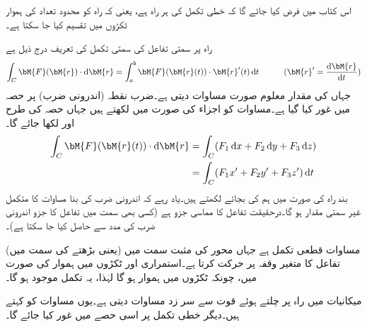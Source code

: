 اس کتاب میں فرض کیا جائے گا کہ خطی تکمل کی ہر راہ   ہے، یعنی کہ راہ کو محدود تعداد کی ہموار ٹکڑوں میں تقسیم کیا جا سکتا ہے۔

راہ  پر سمتی تفاعل  کی سمتی تکمل کی تعریف درج ذیل ہے
\begin{align}\label{مساوات_سمتی_تکمل_سمتی_تفاعل_تکمل_الف}
\int_C \bM{F}(\bM{r})\cdot \dif \bM{r}=\int_a^b \bM{F}(\bM{r}(t))\cdot \bM{r}'(t)\dif t\quad \quad \quad (\bM{r}'=\frac{\dif \bM{r}}{\dif t})
\end{align}
 جہاں  کی مقدار معلوم صورت  مساوات  دیتی ہے۔ضرب نقطہ (اندرونی ضرب) پر حصہ  میں غور کیا گیا ہے۔مساوات  کو اجزاء کی صورت میں لکھتے ہیں جہاں حصہ  کی طرح  اور  لکھا جائے گا۔
\begin{gather}
\begin{aligned}\label{مساوات_سمتی_تکمل_سمتی_تفاعل_تکمل_ب}
\int_C \bM{F}(\bM{r}(t))\cdot \dif \bM{r}&=\int_C(F_1\dif x+F_2\dif y+F_3\dif z)\\
&=\int_C (F_1x'+F_2y'+F_3z')\dif t
\end{aligned}
\end{gather}
بند راہ کی صورت میں ہم  کی بجائے  لکھتے ہیں۔یاد رہے کہ اندرونی ضرب کی بنا  مساوات  کا متکمل  غیر سمتی مقدار ہو گا۔درحقیقت  تفاعل  کا مماسی جزو ہے (کسی بھی سمت میں تفاعل کا جزو  اندرونی ضرب کی مدد سے حاصل کیا جا سکتا ہے)۔

مساوات   قطعی تکمل  ہے جہاں محور  کی مثبت سمت میں (یعنی بڑھتے  کی سمت میں) تفاعل کا متغیر   وقفہ  پر حرکت کرتا ہے۔استمراری  اور ٹکڑوں میں ہموار  کی صورت میں، چونکہ  ٹکڑوں میں ہموار ہو گا لہٰذا، یہ تکمل موجود ہو گا۔

میکانیات میں راہ  پر چلتے ہوئے قوت  سے سر زد   مساوات  دیتی ہے۔یوں مساوات  کو  کہتے ہیں۔دیگر خطی تکمل پر اسی حصے میں غور کیا جائے گا۔

